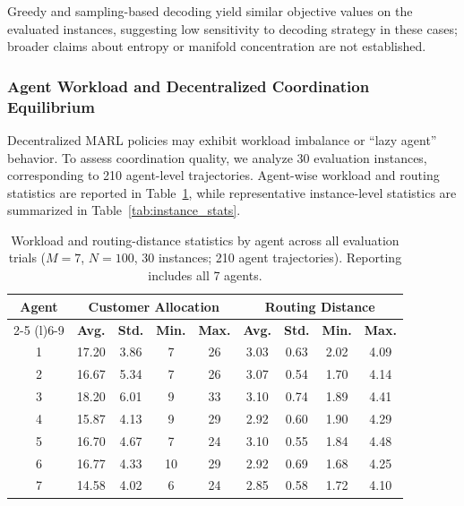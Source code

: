 \documentclass[journal,twoside,web]{ieeecolor}
\theoremstyle{definition}
\theoremstyle{remark}
\theoremstyle{definition}
\begin{document}
Greedy and sampling-based decoding yield similar objective values on the evaluated instances, suggesting low sensitivity to decoding strategy in these cases; broader claims about entropy or manifold concentration are not established.

\subsubsection{Agent Workload and Decentralized Coordination Equilibrium}

Decentralized MARL policies may exhibit workload imbalance or ``lazy agent'' behavior. To assess coordination quality, we analyze 30 evaluation instances, corresponding to 210 agent-level trajectories. Agent-wise workload and routing statistics are reported in Table~\ref{tab:agent_stats}, while representative instance-level statistics are summarized in Table~\ref{tab:instance_stats}.

\begin{table}[htbp]
\centering
\caption{Workload and routing-distance statistics by agent across all evaluation trials ($M{=}7$, $N{=}100$, 30 instances; 210 agent trajectories). Reporting includes all 7 agents.}
\label{tab:agent_stats}
\small
\begin{tabular}{ccccccccc}
\toprule
\textbf{Agent} & \multicolumn{4}{c}{\textbf{Customer Allocation}} & \multicolumn{4}{c}{\textbf{Routing Distance}} \\
\cmidrule(r){2-5} \cmidrule(l){6-9}
& \textbf{Avg.} & \textbf{Std.} & \textbf{Min.} & \textbf{Max.}
& \textbf{Avg.} & \textbf{Std.} & \textbf{Min.} & \textbf{Max.} \\
\midrule
1 & 17.20 & 3.86 & 7  & 26 & 3.03 & 0.63 & 2.02 & 4.09 \\
2 & 16.67 & 5.34 & 7  & 26 & 3.07 & 0.54 & 1.70 & 4.14 \\
3 & 18.20 & 6.01 & 9  & 33 & 3.10 & 0.74 & 1.89 & 4.41 \\
4 & 15.87 & 4.13 & 9  & 29 & 2.92 & 0.60 & 1.90 & 4.29 \\
5 & 16.70 & 4.67 & 7  & 24 & 3.10 & 0.55 & 1.84 & 4.48 \\
6 & 16.77 & 4.33 & 10 & 29 & 2.92 & 0.69 & 1.68 & 4.25 \\
7 & 14.58 & 4.02 & 6  & 24 & 2.85 & 0.58 & 1.72 & 4.10 \\
\bottomrule
\end{tabular}
\end{table}
\end{document}
